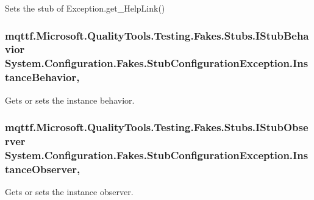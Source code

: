 Sets the stub of Exception.\-get\-\_\-\-Help\-Link()

\hypertarget{class_system_1_1_configuration_1_1_fakes_1_1_stub_configuration_exception_a0146fc96238d55eb9d3359604a199fc1}{
\subsubsection[{Instance\-Behavior}]{\setlength{\rightskip}{0pt plus 5cm}mqttf.\-Microsoft.\-Quality\-Tools.\-Testing.\-Fakes.\-Stubs.\-I\-Stub\-Behavior System.\-Configuration.\-Fakes.\-Stub\-Configuration\-Exception.\-Instance\-Behavior\hspace{0.3cm}{\ttfamily [get]}, {\ttfamily [set]}}}\label{class_system_1_1_configuration_1_1_fakes_1_1_stub_configuration_exception_a0146fc96238d55eb9d3359604a199fc1}


Gets or sets the instance behavior.

\hypertarget{class_system_1_1_configuration_1_1_fakes_1_1_stub_configuration_exception_a0ac072f0a45d661ccd543f2ac1c344c7}{
\subsubsection[{Instance\-Observer}]{\setlength{\rightskip}{0pt plus 5cm}mqttf.\-Microsoft.\-Quality\-Tools.\-Testing.\-Fakes.\-Stubs.\-I\-Stub\-Observer System.\-Configuration.\-Fakes.\-Stub\-Configuration\-Exception.\-Instance\-Observer\hspace{0.3cm}{\ttfamily [get]}, {\ttfamily [set]}}}\label{class_system_1_1_configuration_1_1_fakes_1_1_stub_configuration_exception_a0ac072f0a45d661ccd543f2ac1c344c7}


Gets or sets the instance observer.

